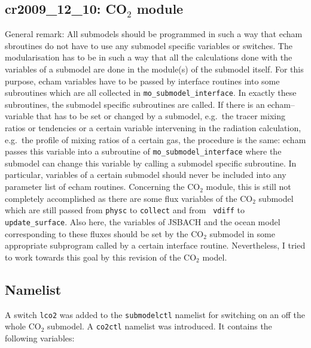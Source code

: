 \begin{appendix}
\clearpage\newpage



\clearpage\newpage
\section{cr2009\_12\_10: CO$_2$ module}\label{cr20091210}

General remark: All submodels should be programmed in such a way that echam
sbroutines do not have to use any submodel specific variables or switches. The
modularisation has to be in such a way that all the calculations done with
the variables of a submodel are done in the module(s) of the submodel
itself. For this purpose, echam variables have to be passed by
interface routines into some subroutines which are all collected in
{\tt mo\_submodel\_interface}. In exactly these subroutines, the
submodel specific subroutines are called. If there is an
echam--variable that has to be set or changed by a submodel, e.g.~the
tracer mixing ratios or tendencies or a certain variable intervening
in the radiation calculation, e.g.~the profile of mixing ratios of a
certain gas, the procedure is the same: echam passes this variable
into a subroutine of {\tt mo\_submodel\_interface} where the submodel
can change this variable by calling a submodel specific subroutine.
In particular, variables of a certain submodel should never be
included into any parameter list of echam routines.
Concerning the CO$_2$ module, this is still not completely
accomplished as there are some flux variables of the CO$_2$ submodel
which are still passed from {\tt physc} to {\tt collect} and from {\tt
  vdiff} to {\tt update\_surface}. Also here, the variables of JSBACH
and the ocean model corresponding to these fluxes should be set by the
CO$_2$ submodel in some appropriate subprogram called by a certain
interface routine. Nevertheless, I tried to work towards this goal by
this revision of the CO$_2$ model.

\subsection{Namelist}

A switch {\tt lco2} was added to the {\tt submodelctl} namelist for
switching on an off the whole CO$_2$ submodel. A {\tt co2ctl} namelist
was introduced. It contains the following variables:


\end{appendix}
